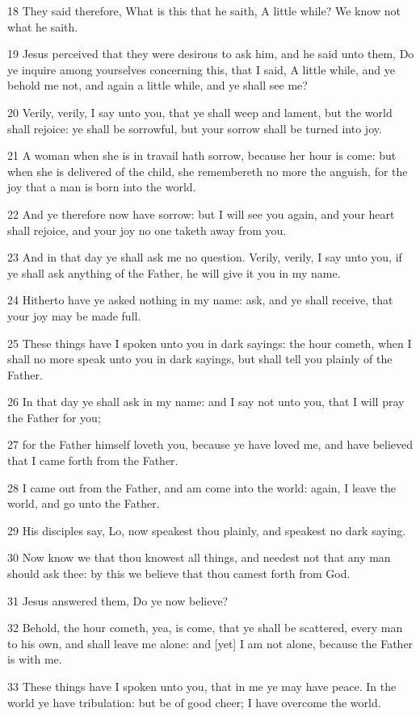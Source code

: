 \par 18 They said therefore, What is this that he saith, A little while? We know not what he saith.
\par 19 Jesus perceived that they were desirous to ask him, and he said unto them, Do ye inquire among yourselves concerning this, that I said, A little while, and ye behold me not, and again a little while, and ye shall see me?
\par 20 Verily, verily, I say unto you, that ye shall weep and lament, but the world shall rejoice: ye shall be sorrowful, but your sorrow shall be turned into joy.
\par 21 A woman when she is in travail hath sorrow, because her hour is come: but when she is delivered of the child, she remembereth no more the anguish, for the joy that a man is born into the world.
\par 22 And ye therefore now have sorrow: but I will see you again, and your heart shall rejoice, and your joy no one taketh away from you.
\par 23 And in that day ye shall ask me no question. Verily, verily, I say unto you, if ye shall ask anything of the Father, he will give it you in my name.
\par 24 Hitherto have ye asked nothing in my name: ask, and ye shall receive, that your joy may be made full.
\par 25 These things have I spoken unto you in dark sayings: the hour cometh, when I shall no more speak unto you in dark sayings, but shall tell you plainly of the Father.
\par 26 In that day ye shall ask in my name: and I say not unto you, that I will pray the Father for you;
\par 27 for the Father himself loveth you, because ye have loved me, and have believed that I came forth from the Father.
\par 28 I came out from the Father, and am come into the world: again, I leave the world, and go unto the Father.
\par 29 His disciples say, Lo, now speakest thou plainly, and speakest no dark saying.
\par 30 Now know we that thou knowest all things, and needest not that any man should ask thee: by this we believe that thou camest forth from God.
\par 31 Jesus answered them, Do ye now believe?
\par 32 Behold, the hour cometh, yea, is come, that ye shall be scattered, every man to his own, and shall leave me alone: and [yet] I am not alone, because the Father is with me.
\par 33 These things have I spoken unto you, that in me ye may have peace. In the world ye have tribulation: but be of good cheer; I have overcome the world.

